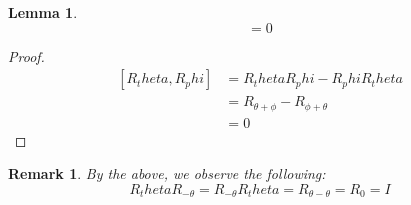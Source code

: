 \documentclass{article}
\newtheorem{lemma}{Lemma}
\newtheorem{remark}{Remark}
\begin{document}
\begin{lemma}
  \begin{equation}
    [R_theta, R_phi] = 0
  \end{equation}
\end{lemma}

\begin{proof}
  \begin{equation}
    \begin{split}
      [R_theta, R_phi]
      &= R_theta R_phi - R_phi R_theta \\
      &= R_{\theta + \phi} - R_{\phi + \theta} \\
      &= 0
    \end{split}
  \end{equation}
\end{proof}

\begin{remark}
  By the above, we observe the following:
  \begin{equation}
    R_theta R_{- \theta} = R_{- \theta} R_theta = R_{\theta - \theta} = R_0 = I
  \end{equation}
\end{remark}
\end{document}
